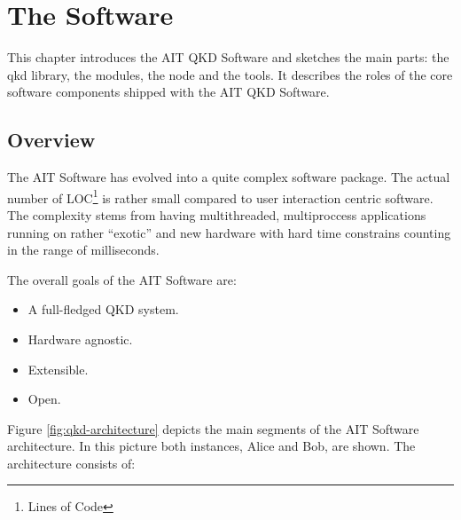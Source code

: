 \chapter{The Software}
\label{chap:The Software}

This chapter introduces the AIT QKD Software and sketches the main parts: the qkd library, the modules, the node and the tools. It describes the roles of the core software components shipped with the AIT QKD Software.

\section{Overview}
\label{sec:Overview}

The AIT Software has evolved into a quite complex software package. The actual number of LOC\footnote{Lines of Code} is rather small compared to user interaction centric software. The complexity stems from having multithreaded, multiproccess applications running on rather ``exotic'' and new hardware with hard time constrains counting in the range of milliseconds.

\medskip

The overall goals of the AIT Software are:
\begin{itemize}

    \item A full-fledged QKD system.

    \item Hardware agnostic.

    \item Extensible.

    \item Open.

\end{itemize}

\medskip

Figure \ref{fig:qkd-architecture} depicts the main segments of the AIT Software architecture. In this picture both instances, Alice and Bob, are shown. The architecture consists of:

